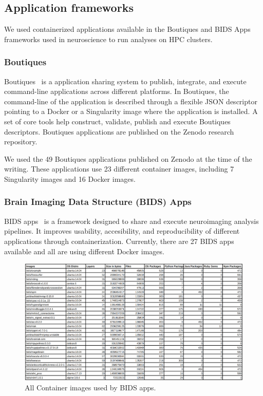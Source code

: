 \documentclass[a4paper,num-refs]{oup-contemporary}
\begin{document}
\subsection{Application frameworks}

We used containerized applications available in the Boutiques and BIDS Apps
frameworks used in neuroscience to run analyses on HPC clusters. 

\subsubsection{Boutiques}

Boutiques~\cite{glatard2018boutiques} is a application sharing system to
publish, integrate, and execute command-line applications across different
platforms. In Boutiques, the command-line of the application is described
through a flexible JSON descriptor pointing to a Docker or a Singularity
image where the application is installed. A set of core tools help
construct, validate, publish and execute Boutiques descriptors. Boutiques
applications are published on the Zenodo research repository.

We used the 49 Boutiques applications published on Zenodo at the time of
the writing. These applications use 23 different container images,
including 7 Singularity images and 16 Docker images.

\subsubsection{Brain Imaging Data Structure (BIDS) Apps}

BIDS apps~\cite{gorgolewski2017bids} is a framework designed to share and execute neuroimaging
analysis pipelines. It improves usability, accesibility, and reproducibility
of different applications through containerization.
Currently, there are 27 BIDS apps available and all are using different Docker images.

\begin{figure}
  \centering
  \includegraphics[width=.7\columnwidth]{Figures/bids_table.png}
  \caption{All Container images used by BIDS apps.}
  \label{fig:bids_apps}
\end{figure}
\end{document}
